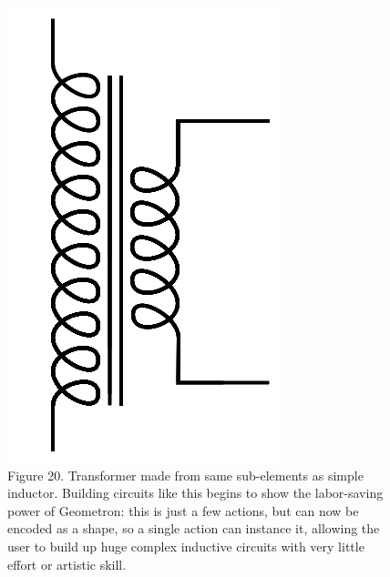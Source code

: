 \documentclass[11pt]{article}
\begin{document}
\begin{figure}

\includegraphics[width=\linewidth]{figures/figure20_transformer.png}

\caption{Figure 20. Transformer made from same sub-elements as simple inductor.  Building circuits like this begins to show the labor-saving power of Geometron: this is just a few actions, but can now be encoded as a shape, so a single action can instance it, allowing the user to build up huge complex inductive circuits with very little effort or artistic skill. }
\end{figure}
\end{document}

